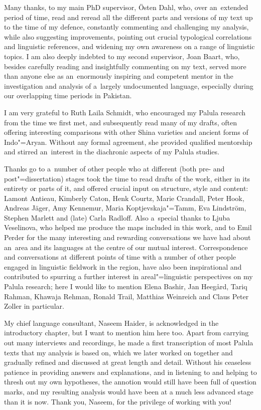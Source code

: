 \begin{refsection}
Many thanks, to my main PhD supervisor, Östen Dahl, who, over
an~extended period of time, read and reread all the different parts and versions of my text up to the time of my defence, constantly commenting and challenging my analysis, while also suggesting improvements, pointing out crucial typological correlations and linguistic references, and widening my own awareness on a range of linguistic topics. I am also deeply indebted to my second supervisor, Joan Baart, who,
besides carefully reading and insightfully commenting on my text, served more than anyone else as an~enormously inspiring and competent mentor in the investigation and analysis of a~largely undocumented language, especially during our overlapping time periods in Pakistan.


I am very grateful to Ruth Laila Schmidt, who encouraged my Palula research from the time we first met, and subsequently read many of my drafts, often offering interesting comparisons with other Shina varieties and ancient forms of Indo"=Aryan. Without any formal agreement, she
provided qualified mentorship and stirred an~interest in the diachronic aspects of my Palula studies.


Thanks go to a~number of other people who at different (both pre- and post"=dissertation) stages took the time to read drafts of the work, either in its entirety or parts of it, and offered crucial input on structure, style and content: Lamont Antieau, Kimberly Caton, Henk Courtz, Marie Crandall, Peter Hook, Andreas Jäger, Amy Kennemur, Maria Koptjevskaja"=Tamm, Eva Lindström, Stephen Marlett and (late) Carla Radloff. Also a~special thanks to Ljuba Veselinova, who helped me produce the maps included in this work, and to Emil Perder for the many interesting and rewarding conversations we have had about
an~area and its languages at the centre of our mutual interest. Correspondence and conversations at different points of time with a number of other people engaged in linguistic fieldwork in the region, have also been inspirational and contributed to spurring a further interest in areal"=linguistic perspectives on my Palula research; here I would like to mention Elena Bashir, Jan Heegård, Tariq Rahman, Khawaja Rehman, Ronald Trail, Matthias Weinreich and Claus Peter Zoller in particular.


My chief language consultant, Naseem Haider, is acknowledged in the introductory chapter, but I want to mention him here too. Apart from carrying out many interviews and recordings, he made a first transcription of most Palula texts that my analysis is based on, which we later worked on together and gradually refined and discussed at great length and detail. Without his ceaseless patience in providing answers and explanations, and in listening to and helping to thresh out my own hypotheses, the annotion would still have been full of question marks, and my resulting analysis would have been at a much less advanced stage than it is now. Thank you, Naseem, for the privilege of working with you!



\end{refsection}
